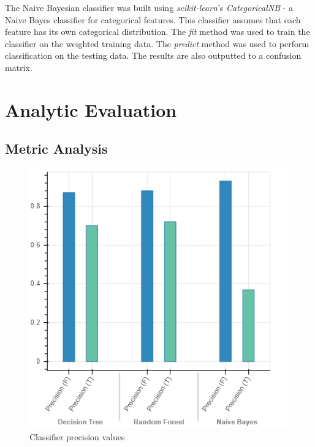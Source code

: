 \documentclass[10pt, conference, compsocconf]{IEEEtran}
\begin{document}
The Naive Bayesian classifier was built using \textit{scikit-learn}'s \textit{CategoricalNB} - a Naive Bayes classifier for categorical features. This classifier assumes that each feature has its own categorical distribution. The \textit{fit} method was used to train the classifier on the weighted training data. The \textit{predict} method was used to perform classification on the testing data. The results are also outputted to a confusion matrix.

\section{Analytic Evaluation}

\subsection{Metric Analysis}

\begin{figure}
  \includegraphics[scale=0.45]{precision}
  \centering
  \caption{Classifier precision values}
  \label{fig:precision}
\end{figure}
\end{document}
